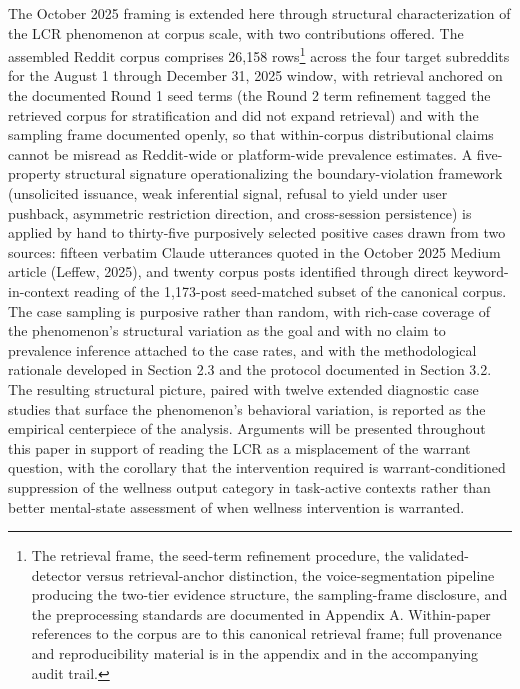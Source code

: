 \documentclass[11pt]{article}
\begin{document}
The October 2025 framing is extended here through structural characterization of the LCR phenomenon at corpus scale, with two contributions offered. The assembled Reddit corpus comprises 26,158 rows\footnote{The retrieval frame, the seed-term refinement procedure, the validated-detector versus retrieval-anchor distinction, the voice-segmentation pipeline producing the two-tier evidence structure, the sampling-frame disclosure, and the preprocessing standards are documented in Appendix A. Within-paper references to the corpus are to this canonical retrieval frame; full provenance and reproducibility material is in the appendix and in the accompanying audit trail.} across the four target subreddits for the August 1 through December 31, 2025 window, with retrieval anchored on the documented Round 1 seed terms (the Round 2 term refinement tagged the retrieved corpus for stratification and did not expand retrieval) and with the sampling frame documented openly, so that within-corpus distributional claims cannot be misread as Reddit-wide or platform-wide prevalence estimates. A five-property structural signature operationalizing the boundary-violation framework (unsolicited issuance, weak inferential signal, refusal to yield under user pushback, asymmetric restriction direction, and cross-session persistence) is applied by hand to thirty-five purposively selected positive cases drawn from two sources: fifteen verbatim Claude utterances quoted in the October 2025 Medium article (Leffew, 2025), and twenty corpus posts identified through direct keyword-in-context reading of the 1,173-post seed-matched subset of the canonical corpus. The case sampling is purposive rather than random, with rich-case coverage of the phenomenon's structural variation as the goal and with no claim to prevalence inference attached to the case rates, and with the methodological rationale developed in Section 2.3 and the protocol documented in Section 3.2. The resulting structural picture, paired with twelve extended diagnostic case studies that surface the phenomenon's behavioral variation, is reported as the empirical centerpiece of the analysis. Arguments will be presented throughout this paper in support of reading the LCR as a misplacement of the warrant question, with the corollary that the intervention required is warrant-conditioned suppression of the wellness output category in task-active contexts rather than better mental-state assessment of when wellness intervention is warranted.

\FloatBarrier
\end{document}
